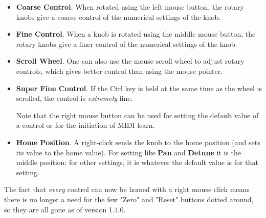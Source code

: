    \begin{itemize}

      \item \textbf{Coarse Control}.
         When rotated using the left mouse button, the rotary knobs give a
         coarse control of the numerical settings of the knob.

      \item \textbf{Fine Control}.
         When a knob is rotated using the middle mouse button, the rotary knobs
         give a finer control of the numerical settings of the knob.

      \item \textbf{Scroll Wheel}.
         One can also use the mouse scroll wheel to adjust rotary controls,
         which gives better control than using the mouse pointer.

      \item \textbf{Super Fine Control}.
         If the Ctrl key is held at the same time as the wheel is scrolled, the
         control is \textsl{extremely} fine.

   Note that the right mouse button can be used for setting the default value of a
   control or for the initiation of
   MIDI learn.


      \item \textbf{Home Position}.
         A right-click sends the knob to the home position (and sets its value
         to the home value). For setting like \textbf{Pan} and
         \textbf{Detune} it is the middle position; for other settings,
         it is whatever the default value is for that setting.

   \end{itemize}

   The fact that \textsl{every} control can now be homed with a right mouse
   click means there is no longer a need for the few "Zero" and "Reset" buttons
   dotted around, so they are all gone as of version 1.4.0.


